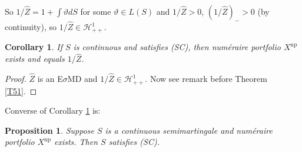 \documentclass[12pt,a4paper, twoside]{article}
\newtheorem{prop}{Proposition}[section]
\newtheorem{cor}{Corollary}[section]
\theoremstyle{definition}
\begin{document}
So $1/ \hat{Z}= 1 + \int \vartheta dS$ for some $\vartheta \in L(S)$ and $1/\hat{Z}>0$, $(1/\hat{Z})_- >0$ (by continuity), so $1/\hat{Z} \in \mathcal{H}_{++}^1$. 
\begin{cor} \label{C55} If $S$ is continuous and satisfies (SC), then numéraire portfolio $X^\text{np}$ exists and equals $1/\hat{Z}$.
\end{cor}
\begin{proof}
$\hat{Z}$ is an E$\sigma$MD and $1/\hat{Z} \in \mathcal{H}_{++}^1$. Now see remark before Theorem \ref{T51}.
\end{proof}
Converse of Corollary \ref{C55} is:
\begin{prop}\label{P56} Suppose $S$ is a continuous semimartingale and numéraire portfolio $X^\text{np}$ exists. Then $S$ satisfies (SC). 
\end{prop}
\end{document}
